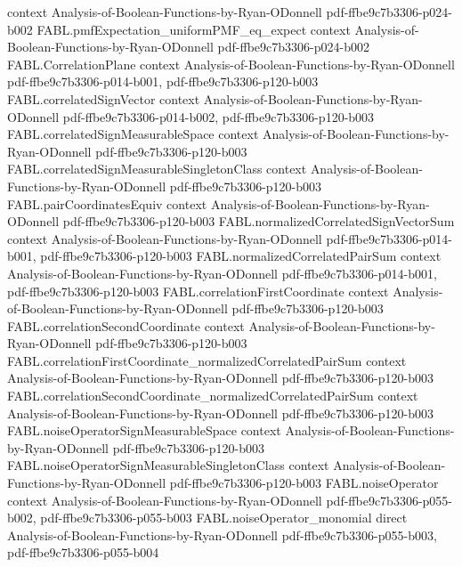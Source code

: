 \begin{theorem}
  {context}
  {Analysis-of-Boolean-Functions-by-Ryan-ODonnell}
  {pdf-ffbe9c7b3306-p024-b002}
\proofstep
  {FABL.pmfExpectation_uniformPMF_eq_expect}
  {context}
  {Analysis-of-Boolean-Functions-by-Ryan-ODonnell}
  {pdf-ffbe9c7b3306-p024-b002}
\proofstep
  {FABL.CorrelationPlane}
  {context}
  {Analysis-of-Boolean-Functions-by-Ryan-ODonnell}
  {pdf-ffbe9c7b3306-p014-b001,
    pdf-ffbe9c7b3306-p120-b003}
\proofstep
  {FABL.correlatedSignVector}
  {context}
  {Analysis-of-Boolean-Functions-by-Ryan-ODonnell}
  {pdf-ffbe9c7b3306-p014-b002,
    pdf-ffbe9c7b3306-p120-b003}
\proofstep
  {FABL.correlatedSignMeasurableSpace}
  {context}
  {Analysis-of-Boolean-Functions-by-Ryan-ODonnell}
  {pdf-ffbe9c7b3306-p120-b003}
\proofstep
  {FABL.correlatedSignMeasurableSingletonClass}
  {context}
  {Analysis-of-Boolean-Functions-by-Ryan-ODonnell}
  {pdf-ffbe9c7b3306-p120-b003}
\proofstep
  {FABL.pairCoordinatesEquiv}
  {context}
  {Analysis-of-Boolean-Functions-by-Ryan-ODonnell}
  {pdf-ffbe9c7b3306-p120-b003}
\proofstep
  {FABL.normalizedCorrelatedSignVectorSum}
  {context}
  {Analysis-of-Boolean-Functions-by-Ryan-ODonnell}
  {pdf-ffbe9c7b3306-p014-b001,
    pdf-ffbe9c7b3306-p120-b003}
\proofstep
  {FABL.normalizedCorrelatedPairSum}
  {context}
  {Analysis-of-Boolean-Functions-by-Ryan-ODonnell}
  {pdf-ffbe9c7b3306-p014-b001,
    pdf-ffbe9c7b3306-p120-b003}
\proofstep
  {FABL.correlationFirstCoordinate}
  {context}
  {Analysis-of-Boolean-Functions-by-Ryan-ODonnell}
  {pdf-ffbe9c7b3306-p120-b003}
\proofstep
  {FABL.correlationSecondCoordinate}
  {context}
  {Analysis-of-Boolean-Functions-by-Ryan-ODonnell}
  {pdf-ffbe9c7b3306-p120-b003}
\proofstep
  {FABL.correlationFirstCoordinate_normalizedCorrelatedPairSum}
  {context}
  {Analysis-of-Boolean-Functions-by-Ryan-ODonnell}
  {pdf-ffbe9c7b3306-p120-b003}
\proofstep
  {FABL.correlationSecondCoordinate_normalizedCorrelatedPairSum}
  {context}
  {Analysis-of-Boolean-Functions-by-Ryan-ODonnell}
  {pdf-ffbe9c7b3306-p120-b003}
\proofstep
  {FABL.noiseOperatorSignMeasurableSpace}
  {context}
  {Analysis-of-Boolean-Functions-by-Ryan-ODonnell}
  {pdf-ffbe9c7b3306-p120-b003}
\proofstep
  {FABL.noiseOperatorSignMeasurableSingletonClass}
  {context}
  {Analysis-of-Boolean-Functions-by-Ryan-ODonnell}
  {pdf-ffbe9c7b3306-p120-b003}
\proofstep
  {FABL.noiseOperator}
  {context}
  {Analysis-of-Boolean-Functions-by-Ryan-ODonnell}
  {pdf-ffbe9c7b3306-p055-b002,
    pdf-ffbe9c7b3306-p055-b003}
\proofstep
  {FABL.noiseOperator_monomial}
  {direct}
  {Analysis-of-Boolean-Functions-by-Ryan-ODonnell}
  {pdf-ffbe9c7b3306-p055-b003,
    pdf-ffbe9c7b3306-p055-b004}

\end{theorem}
